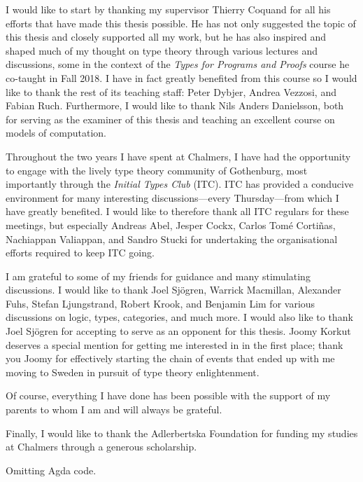 \begin{acknowledgements}
  I would like to start by thanking my supervisor Thierry Coquand for all his efforts that
  have made this thesis possible. He has not only suggested the topic of this thesis and
  closely supported all my work, but he has also inspired and shaped much of my thought on
  type theory through various lectures and discussions, some in the context of
  the \emph{Types for Programs and Proofs} course he co-taught in Fall 2018. I have in
  fact greatly benefited from this course so I would like to thank the rest of its
  teaching staff: Peter Dybjer, Andrea Vezzosi, and Fabian Ruch. Furthermore, I would like
  to thank Nils Anders Danielsson, both for serving as the examiner of this thesis and
  teaching an excellent course on models of computation.

  Throughout the two years I have spent at Chalmers, I have had the opportunity to engage
  with the lively type theory community of Gothenburg, most importantly through
  the \emph{Initial Types Club} (ITC). ITC has provided a conducive environment for many
  interesting discussions---every Thursday---from which I have greatly benefited. I would like
  to therefore thank all ITC regulars for these meetings, but especially Andreas Abel,
  Jesper Cockx, Carlos Tomé Cortiñas, Nachiappan Valiappan, and Sandro Stucki for
  undertaking the organisational efforts required to keep ITC going.

  I am grateful to some of my friends for guidance and many stimulating discussions. I
  would like to thank Joel Sjögren, Warrick Macmillan, Alexander Fuhs, Stefan
  Ljung\-strand, Robert Krook, and Benjamin Lim for various discussions on logic, types,
  categories, and much more. I would also like to thank Joel Sjögren for accepting to
  serve as an opponent for this thesis. Joomy Korkut deserves a special mention for
  getting me interested in \veragda{} in the first place; thank you Joomy for effectively
  starting the chain of events that ended up with me moving to Sweden in pursuit of type
  theory enlightenment.

  Of course, everything I have done has been possible with the support of my parents to
  whom I am and will always be grateful.

  Finally, I would like to thank the Adlerbertska Foundation for funding my studies at
  Chalmers through a generous scholarship.
\end{acknowledgements}

\makelists{}













\makebackmatter{}

\ifdefined\omitagdainappendix
  Omitting Agda code.
\else

\fi


